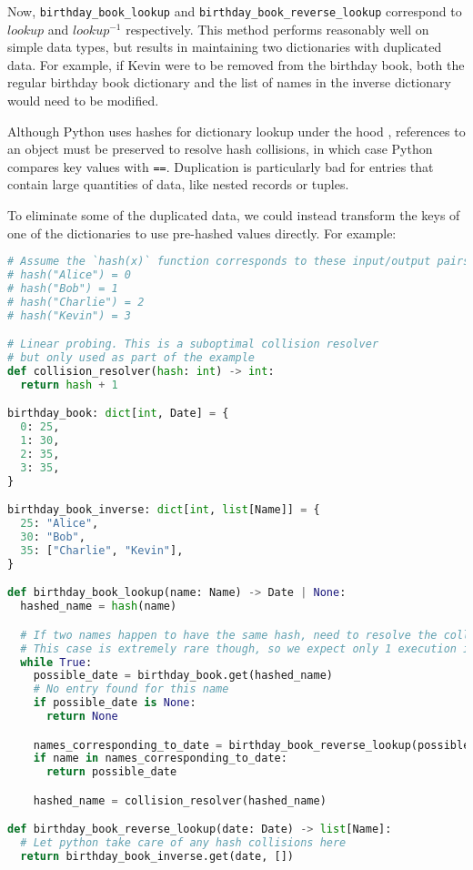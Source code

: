 \documentclass{article}
\begin{document}
Now, \texttt{birthday\_book\_lookup} and \texttt{birthday\_book\_reverse\_lookup} correspond to $lookup$ and $lookup^{-1}$ respectively. This method performs reasonably well on simple data types, but results in maintaining two dictionaries with duplicated data. For example, if Kevin were to be removed from the birthday book, both the regular birthday book dictionary and the list of names in the inverse dictionary would need to be modified.

Although Python uses hashes for dictionary lookup under the hood \cite{pythonDictImplementation}, references to an object must be preserved to resolve hash collisions, in which case Python compares key values with \texttt{==}. Duplication is particularly bad for entries that contain large quantities of data, like nested records or tuples.

To eliminate some of the duplicated data, we could instead transform the keys of one of the dictionaries to use pre-hashed values directly. For example:

\begin{lstlisting}[language=python]
# Assume the `hash(x)` function corresponds to these input/output pairs:
# hash("Alice") = 0
# hash("Bob") = 1
# hash("Charlie") = 2
# hash("Kevin") = 3

# Linear probing. This is a suboptimal collision resolver
# but only used as part of the example
def collision_resolver(hash: int) -> int:
  return hash + 1

birthday_book: dict[int, Date] = {
  0: 25,
  1: 30,
  2: 35,
  3: 35,
}

birthday_book_inverse: dict[int, list[Name]] = {
  25: "Alice",
  30: "Bob",
  35: ["Charlie", "Kevin"],
}

def birthday_book_lookup(name: Name) -> Date | None:
  hashed_name = hash(name)

  # If two names happen to have the same hash, need to resolve the collision manually
  # This case is extremely rare though, so we expect only 1 execution iteration for this loop
  while True:
    possible_date = birthday_book.get(hashed_name)
    # No entry found for this name
    if possible_date is None:
      return None

    names_corresponding_to_date = birthday_book_reverse_lookup(possible_date)
    if name in names_corresponding_to_date:
      return possible_date

    hashed_name = collision_resolver(hashed_name)

def birthday_book_reverse_lookup(date: Date) -> list[Name]:
  # Let python take care of any hash collisions here
  return birthday_book_inverse.get(date, [])
\end{lstlisting}
\end{document}
